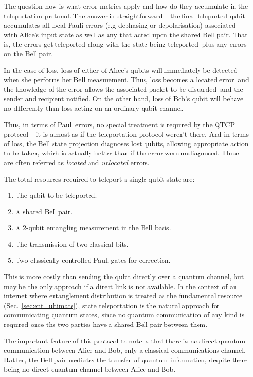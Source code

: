 The question now is what error metrics apply and how do they accumulate in the teleportation protocol. The answer is straightforward -- the final teleported qubit accumulates all local Pauli errors (e.g dephasing or depolarisation) associated with Alice's input state as well as any that acted upon the shared Bell pair. That is, the errors get teleported along with the state being teleported, plus any errors on the Bell pair.

In the case of loss, loss of either of Alice's qubits will immediately be detected when she performs her Bell measurement. Thus, loss becomes a located error, and the knowledge of the error allows the associated packet to be discarded, and the sender and recipient notified. On the other hand, loss of Bob's qubit will behave no differently than loss acting on an ordinary qubit channel.

Thus, in terms of Pauli errors, no special treatment is required by the QTCP protocol -- it is almost as if the teleportation protocol weren't there. And in terms of loss, the Bell state projection diagnoses lost qubits, allowing appropriate action to be taken, which is actually better than if the error were undiagnosed. These are often referred as \textit{located} and \textit{unlocated} errors.

The total resources required to teleport a single-qubit state are:
\begin{enumerate}
\item The qubit to be teleported.
\item A shared Bell pair.
\item A 2-qubit entangling measurement in the Bell basis.
\item The transmission of two classical bits.
\item Two classically-controlled Pauli gates for correction.
\end{enumerate}

This is more costly than sending the qubit directly over a quantum channel, but may be the only approach if a direct link is not available. In the context of an internet where entanglement distribution is treated as the fundamental resource (Sec.~\ref{sec:ent_ultimate}), state teleportation is the natural approach for communicating quantum states, since no quantum communication of any kind is required once the two parties have a shared Bell pair between them.

The important feature of this protocol to note is that there is no direct quantum communication between Alice and Bob, only a classical communications channel. Rather, the Bell pair mediates the transfer of quantum information, despite there being no direct quantum channel between Alice and Bob.

